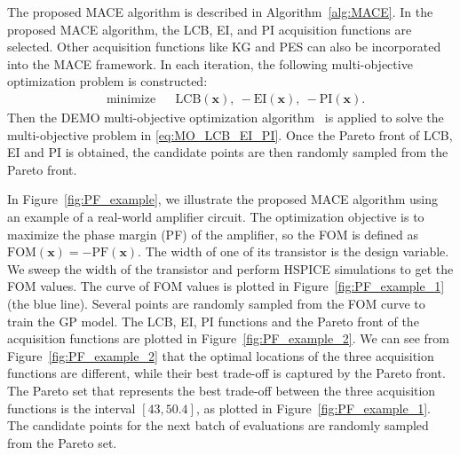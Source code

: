 The proposed MACE algorithm is described in Algorithm~\ref{alg:MACE}. In the proposed MACE algorithm, the LCB, EI, and PI acquisition functions are selected. Other acquisition functions like KG and PES can also be incorporated into the MACE framework. In each iteration, the following multi-objective optimization problem is constructed:
\begin{equation}
    \label{eq:MO_LCB_EI_PI}
    \begin{aligned}
        & \text{minimize} & & \mathrm{LCB}(\bm{x}),~-\mathrm{EI}(\bm{x}),~-\mathrm{PI}(\bm{x}).
    \end{aligned}
\end{equation}
Then the DEMO multi-objective optimization algorithm~\cite{demo} is applied to solve the multi-objective problem in \eqref{eq:MO_LCB_EI_PI}. Once the Pareto front of LCB, EI and PI is obtained, the candidate points are then randomly sampled from the Pareto front.

In Figure~\ref{fig:PF_example}, we illustrate the proposed MACE algorithm using an example of a real-world amplifier circuit. The optimization objective is to maximize the phase margin (PF) of the amplifier, so the FOM is defined as $\mathrm{FOM}(\bm{x}) = - \mathrm{PF}(\bm{x})$. The width of one of its transistor is the design variable. We sweep the width of the transistor and perform HSPICE simulations to get the FOM values. The curve of FOM values is plotted in Figure~\ref{fig:PF_example_1} (the blue line). Several points are randomly sampled from the FOM curve to train the GP model. The LCB, EI, PI functions and the Pareto front of the acquisition functions are plotted in Figure~\ref{fig:PF_example_2}. We can see from Figure~\ref{fig:PF_example_2} that the optimal locations of the three acquisition functions are different, while their best trade-off is captured by the Pareto front. The Pareto set that represents the best trade-off between the three acquisition functions is the interval $[43, 50.4]$, as plotted in Figure~\ref{fig:PF_example_1}. The candidate points for the next batch of evaluations are randomly sampled from the Pareto set.

